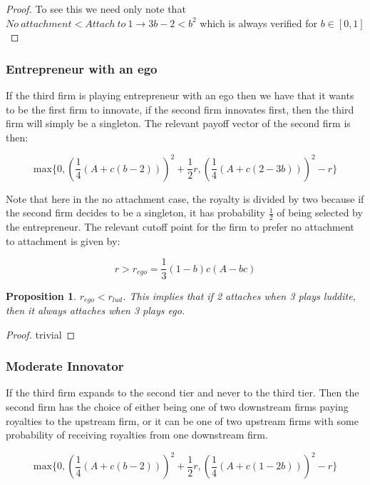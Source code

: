 \documentclass{article}
\newtheorem{proposition}{Proposition}
\begin{document}
\begin{proof}
To see this we need only note that  $No~ attachment<Attach~to~1 \rightarrow 3b-2<b^2$ which is always verified for $b \in [0,1]$
\end{proof}

\subsubsection{Entrepreneur with an ego}

If the third firm is playing entrepreneur with an ego then we have that it wants to be the first firm to innovate, if the second firm innovates first, then the third firm will simply be a singleton. The relevant payoff vector of the second firm is then: 

\begin{equation*}
\text{max} \{ 
0, \left(\frac{1}{4}(A+ c(b-2)) \right)^2+\frac{1}{2}r, \left( \frac{1}{4} (A+c(2-3b) )\right)^2-r
\}
\end{equation*}

Note that here in the no attachment case, the royalty is divided by two because if the second firm decides to be a singleton, it has probability $\frac{1}{2}$ of being selected by the entrepreneur. The relevant cutoff point for the firm to prefer no attachment to attachment is given by: 

\begin{equation*}
r> r_{ego} = \frac{1}{3} (1-b) c (A-b c)
\end{equation*}

\begin{proposition}\label{egolud}
$r_{ego}<r_{lud}$. This implies that if 2 attaches when 3 plays luddite, then it always attaches when 3 plays ego.   
\end{proposition}

\begin{proof}
trivial
\end{proof}

\subsubsection{Moderate Innovator} 
If the third firm expands to the second tier and never to the third tier. Then the second firm has the choice of either being one of two downstream firms paying royalties to the upstream firm, or it can be one of two upstream firms with some probability of receiving royalties from one downstream firm. 

\begin{equation*}
\text{max} \{ 
0, \left(\frac{1}{4}(A+ c(b-2)) \right)^2+\frac{1}{2}r, \left( \frac{1}{4}(A+c(1-2b)) \right)^2 -r
\}
\end{equation*}
\end{document}
